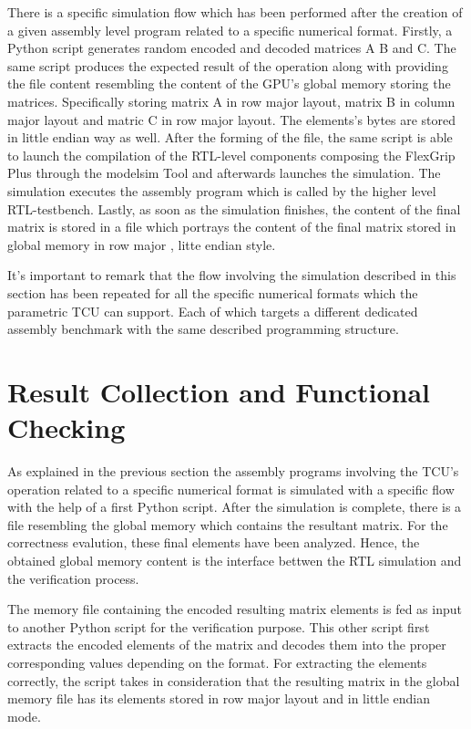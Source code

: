 There is a specific simulation flow which has been performed after the creation of a given assembly level program related to a specific numerical format. Firstly, a Python script generates random encoded and decoded matrices A B and C. The same script produces the expected result of the operation along with providing the file content resembling the content of the GPU's global memory storing the matrices. Specifically storing matrix A in row major layout, matrix B in column major layout and matric C in row major layout. The elements's bytes are stored in little endian way as well. After the forming of the file, the same script is able to launch the compilation of the RTL-level components composing the FlexGrip Plus through the modelsim Tool and afterwards launches the simulation. The simulation executes the assembly program which is called by the higher level RTL-testbench.  Lastly, as soon as the simulation finishes, the content of the final matrix is stored in a file which portrays the content of the final matrix stored in global memory in row major , litte endian style. 

It's important to remark that the flow involving the  simulation described in this section has been repeated for all the specific numerical formats which the parametric TCU can support. Each of which targets a different dedicated assembly benchmark with the same  described programming structure.

\section{Result Collection and Functional Checking} 

As explained in the previous section the assembly programs involving the TCU's operation related to a specific numerical format is simulated with a specific flow with the help of a first Python script. After the simulation is complete, there is a file resembling the global memory which contains the resultant matrix. For the correctness evalution, these final elements have been analyzed. Hence, the obtained global memory content is the interface bettwen the RTL simulation and the verification process.

The memory file containing the  encoded resulting matrix elements is fed as input to another Python script for the verification purpose. This other script first extracts the encoded elements of the matrix and decodes them into the proper corresponding values depending on the format. For extracting the elements correctly, the script takes in consideration that the resulting matrix in the global memory file has its elements stored in row major layout and in little endian mode.

